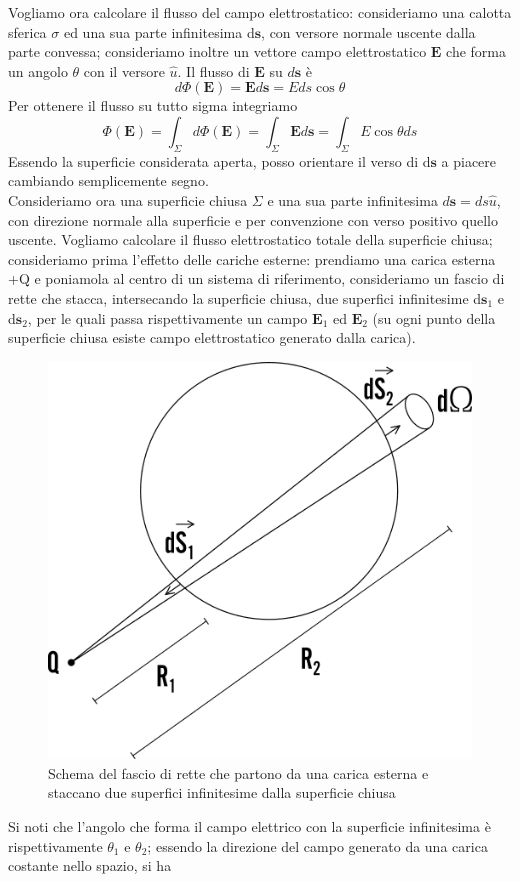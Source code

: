 \documentclass[
10pt, %
a4paper, %
oneside, %
headinclude,footinclude, %
BCOR5mm, %
]{scrartcl}
\begin{document}
Vogliamo ora calcolare il flusso del campo elettrostatico: consideriamo una calotta sferica \(\sigma\) ed una sua parte infinitesima d$\mathbf{s}$, con versore normale uscente dalla parte convessa; consideriamo inoltre un vettore campo elettrostatico $\mathbf{E}$ che forma un angolo \(\theta\) con il versore $\hat{u}$. Il flusso di $\mathbf{E}$ su \(d\mathbf{s}\) è 
\[d\Phi(\mathbf{E}) = \mathbf{E}d\mathbf{s} = Eds\cos\theta\]
Per ottenere il flusso su tutto sigma integriamo 
\[\Phi(\mathbf{E}) = \int_{\Sigma}d\Phi(\mathbf{E}) = \int_{\Sigma}\mathbf{E}d\mathbf{s} = \int_{\Sigma}E\cos\theta ds\]
Essendo la superficie considerata aperta, posso orientare il verso di d$\mathbf{s}$ a piacere cambiando semplicemente segno.\\
Consideriamo ora una superficie chiusa $\Sigma$ e una sua parte infinitesima $d\mathbf{s} = ds \hat{u}$, con direzione normale alla superficie e per convenzione con verso positivo quello uscente. Vogliamo calcolare il flusso elettrostatico totale della superficie chiusa; consideriamo prima l'effetto delle cariche esterne: prendiamo una carica esterna +Q e poniamola al centro di un sistema di riferimento, consideriamo un fascio di rette che stacca, intersecando la superficie chiusa, due superfici infinitesime d$\mathbf{s}_1$ e d$\mathbf{s}_2$, per le quali passa rispettivamente un campo $\mathbf{E}_1$ ed $\mathbf{E}_2$ (su ogni punto della superficie chiusa esiste campo elettrostatico generato dalla carica).  
\begin{figure}[h!]
	\centering
	\includegraphics[width=0.5\linewidth]{../images/thm_gauss_1}
	\caption{Schema del fascio di rette che partono da una carica esterna e staccano due superfici infinitesime dalla superficie chiusa}
	\label{fig:thmgauss1}
\end{figure}
\FloatBarrier
Si noti che l'angolo che forma il campo elettrico con la superficie infinitesima è rispettivamente \(\theta_1\) e \(\theta_2\); essendo la direzione del campo generato da una carica costante nello spazio, si ha
\end{document}
